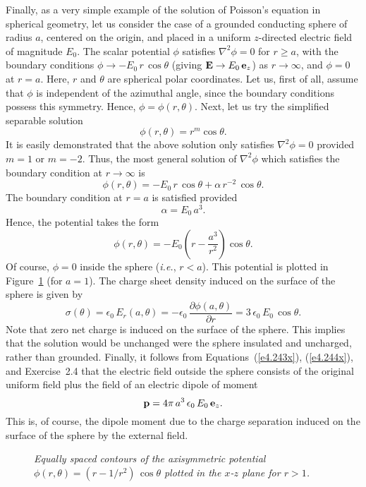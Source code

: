 Finally, as a very simple example of the solution of Poisson's equation in spherical
geometry, let us consider the case of a grounded conducting sphere of radius $a$, centered on the
origin, and placed in a uniform $z$-directed electric field of magnitude $E_0$.
The scalar potential $\phi$ satisfies $\nabla^2\phi=0$ for $r\geq a$, with
the boundary conditions $\phi\rightarrow -E_0\,r\,\cos\theta$ (giving ${\bf E}\rightarrow E_0\,{\bf e}_z$) as
$r\rightarrow\infty$, and $\phi=0$ at $r=a$. Here, $r$ and $\theta$ are spherical polar coordinates. Let us, first of all, assume that $\phi$ is independent of
the azimuthal angle, since the boundary conditions possess this
symmetry. Hence, $\phi  =\phi(r, \theta)$. 
Next, let us try
the simplified separable solution
\begin{equation}
\phi(r, \theta) = r^{m}\cos\theta.
\end{equation}
It is easily demonstrated that the above solution only satisfies $\nabla^2\phi=0$
provided $m=1$ or $m=-2$. Thus, the most general solution of $\nabla^2\phi$
which satisfies the boundary condition at $r\rightarrow\infty$ is
\begin{equation}\label{e4.243x}
\phi(r,\theta) = - E_0\,r\,\cos\theta + \alpha\,r^{-2}\,\cos\theta.
\end{equation}
The boundary condition at $r=a$ is satisfied provided 
\begin{equation}\label{e4.244x}
\alpha = E_0\,a^3.
\end{equation}
Hence, the potential takes the form
\begin{equation}
\phi(r,\theta) = - E_0\left(r - \frac{a^3}{r^2}\right)\cos\theta.
\end{equation}
Of course, $\phi=0$ inside the sphere ({\em i.e.}, $r<a$). This potential
is plotted in Figure~\ref{fex6a} (for $a=1$).
The charge sheet
density induced on the surface of the sphere is given by
\begin{equation}
\sigma (\theta)= \epsilon_0\,E_r(a,\theta) = -\epsilon_0\,\frac{\partial \phi(a,\theta)}{\partial r} = 3\,\epsilon_0\,E_0\,\cos\theta.
\end{equation}
Note that zero net charge is induced on the surface of the sphere. This
implies that the solution would be unchanged were the sphere insulated and
uncharged, rather than grounded. Finally, it follows from Equations~(\ref{e4.243x}), (\ref{e4.244x}), and Exercise~2.4 that the electric field outside the
sphere consists of the original uniform field plus the field of an electric dipole
of moment
\begin{equation}
{\bf p} = 4\pi\,a^3\,\epsilon_0\,E_0\,{\bf e}_z.
\end{equation}
This is, of course, the dipole moment due to the charge
separation induced on the surface of the sphere by the external field.
\begin{figure}
\epsfysize=3in
\centerline{}
\caption{\em Equally spaced contours of the axisymmetric potential $\phi(r,\theta)=(r-1/r^2)\,\cos\theta$ plotted in the $x$-$z$ plane for  $r> 1$.}\label{fex6a}
\end{figure}

